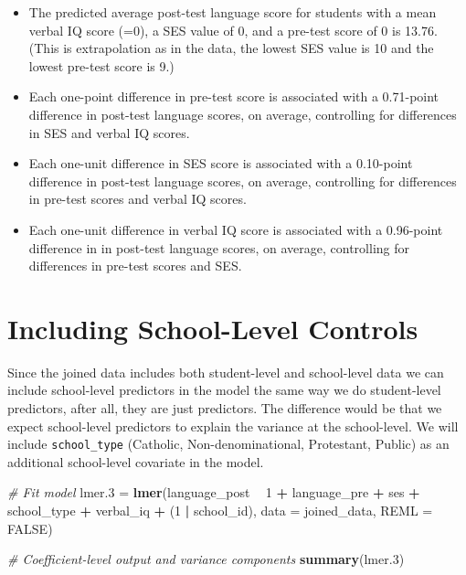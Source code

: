 \documentclass[]{book}
\newenvironment{Shaded}{\begin{snugshade}}{\end{snugshade}}
\newcommand{\CommentTok}[1]{\textcolor[rgb]{0.56,0.35,0.01}{\textit{#1}}}
\newcommand{\DataTypeTok}[1]{\textcolor[rgb]{0.13,0.29,0.53}{#1}}
\newcommand{\DecValTok}[1]{\textcolor[rgb]{0.00,0.00,0.81}{#1}}
\newcommand{\FloatTok}[1]{\textcolor[rgb]{0.00,0.00,0.81}{#1}}
\newcommand{\KeywordTok}[1]{\textcolor[rgb]{0.13,0.29,0.53}{\textbf{#1}}}
\newcommand{\NormalTok}[1]{#1}
\newcommand{\OperatorTok}[1]{\textcolor[rgb]{0.81,0.36,0.00}{\textbf{#1}}}
\newcommand{\OtherTok}[1]{\textcolor[rgb]{0.56,0.35,0.01}{#1}}
\newcommand{\StringTok}[1]{\textcolor[rgb]{0.31,0.60,0.02}{#1}}
\providecommand{\tightlist}{%
  \setlength{\itemsep}{0pt}\setlength{\parskip}{0pt}}
\begin{document}
\begin{itemize}
\tightlist
\item
  The predicted average post-test language score for students with a mean verbal IQ score (=0), a SES value of 0, and a pre-test score of 0 is 13.76. (This is extrapolation as in the data, the lowest SES value is 10 and the lowest pre-test score is 9.)
\item
  Each one-point difference in pre-test score is associated with a 0.71-point difference in post-test language scores, on average, controlling for differences in SES and verbal IQ scores.
\item
  Each one-unit difference in SES score is associated with a 0.10-point difference in post-test language scores, on average, controlling for differences in pre-test scores and verbal IQ scores.
\item
  Each one-unit difference in verbal IQ score is associated with a 0.96-point difference in in post-test language scores, on average, controlling for differences in pre-test scores and SES.
\end{itemize}

\hypertarget{including-school-level-controls}{%
\section{Including School-Level Controls}\label{including-school-level-controls}}

Since the joined data includes both student-level and school-level data we can include school-level predictors in the model the same way we do student-level predictors, after all, they are just predictors. The difference would be that we expect school-level predictors to explain the variance at the school-level. We will include \texttt{school\_type} (Catholic, Non-denominational, Protestant, Public) as an additional school-level covariate in the model.

\begin{Shaded}
\begin{Highlighting}[]
\CommentTok{# Fit model}
\NormalTok{lmer}\FloatTok{.3}\NormalTok{ =}\StringTok{ }\KeywordTok{lmer}\NormalTok{(language_post }\OperatorTok{~}\StringTok{ }\DecValTok{1} \OperatorTok{+}\StringTok{ }\NormalTok{language_pre }\OperatorTok{+}\StringTok{ }\NormalTok{ses }\OperatorTok{+}\StringTok{ }
\StringTok{                }\NormalTok{school_type }\OperatorTok{+}\StringTok{ }\NormalTok{verbal_iq }\OperatorTok{+}\StringTok{ }\NormalTok{(}\DecValTok{1} \OperatorTok{|}\StringTok{ }\NormalTok{school_id), }\DataTypeTok{data =}\NormalTok{ joined_data, }\DataTypeTok{REML =} \OtherTok{FALSE}\NormalTok{)}

\CommentTok{# Coefficient-level output and variance components}
\KeywordTok{summary}\NormalTok{(lmer}\FloatTok{.3}\NormalTok{)}
\end{Highlighting}
\end{Shaded}
\end{document}
